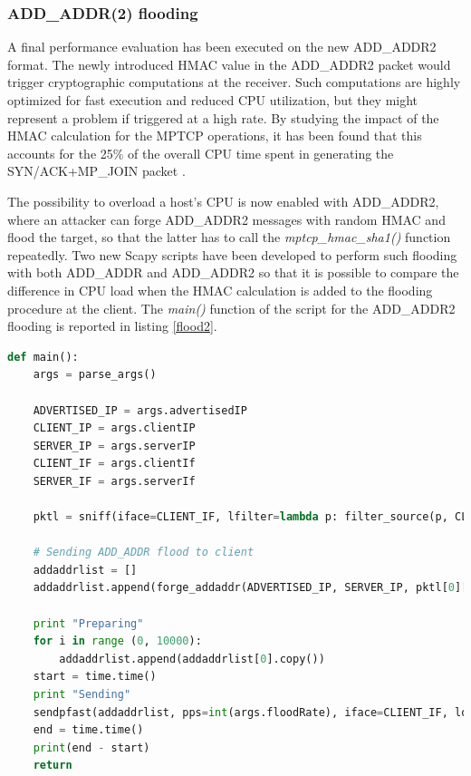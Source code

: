 \subsubsection{ADD\_ADDR(2) flooding}
A final performance evaluation has been executed on the new ADD\_ADDR2 format. The newly introduced HMAC value in the ADD\_ADDR2 packet would trigger cryptographic computations at the receiver. Such computations are highly optimized for fast execution and reduced CPU utilization, but they might represent a problem if triggered at a high rate. 
By studying the impact of the HMAC calculation for the MPTCP operations, it has been found that this accounts for the 25\% of the overall CPU time spent in generating the SYN/ACK+MP\_JOIN packet \cite{P14}.

The possibility to overload a host's CPU is now enabled with ADD\_ADDR2, where an attacker can forge ADD\_ADDR2 messages with random HMAC and flood the target, so that the latter has to call the \textit{mptcp\_hmac\_sha1()} function repeatedly. Two new Scapy scripts have been developed to perform such flooding with both ADD\_ADDR \cite{add-addr-flood} and ADD\_ADDR2 \cite{add-addr-2-flood} so that it is possible to compare the difference in CPU load when the HMAC calculation is added to the flooding procedure at the client. The \textit{main()} function of the script for the ADD\_ADDR2 flooding is reported in listing \ref{flood2}.

\begin{lstlisting}[language=Python, caption=\textit{Scapy flooding tool}, label=flood2]
def main():
    args = parse_args()

    ADVERTISED_IP = args.advertisedIP
    CLIENT_IP = args.clientIP
    SERVER_IP = args.serverIP
    CLIENT_IF = args.clientIf
    SERVER_IF = args.serverIf

    pktl = sniff(iface=CLIENT_IF, lfilter=lambda p: filter_source(p, CLIENT_IP), count=1)

    # Sending ADD_ADDR flood to client
    addaddrlist = []
    addaddrlist.append(forge_addaddr(ADVERTISED_IP, SERVER_IP, pktl[0][TCP].dport, CLIENT_IP, pktl[0][TCP].sport, (pktl[0][TCP].ack)+SEQUENCE_OFFSET, (pktl[0][TCP].seq)-SEQUENCE_OFFSET))
    
    print "Preparing"
    for i in range (0, 10000):
        addaddrlist.append(addaddrlist[0].copy())
    start = time.time()
    print "Sending"
    sendpfast(addaddrlist, pps=int(args.floodRate), iface=CLIENT_IF, loop=10000, file_cache=True)
    end = time.time()
    print(end - start)
    return
\end{lstlisting}

